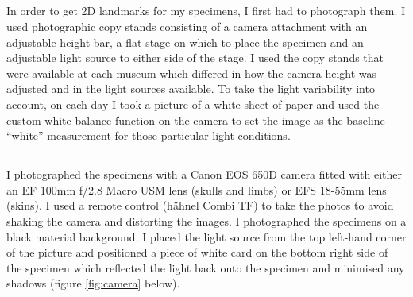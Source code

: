 \subsection{}
In order to get 2D landmarks for my specimens, I first had to photograph them. I used photographic copy stands consisting of a camera attachment with an adjustable height bar, a flat stage on which to place the specimen and an adjustable light source to either side of the stage. I used the copy stands that were available at each museum which differed in how the camera height was adjusted and in the light sources available.
To take the light variability into account, on each day I took a picture of a white sheet of paper and used the custom white balance function on the camera to set the image as the baseline “white” measurement for those particular light conditions.

\subsection{}
I photographed the specimens with a Canon EOS 650D camera fitted with either an EF 100mm f/2.8 Macro USM lens (skulls and limbs) or EFS 18-55mm lens (skins). I used a remote control (h\"ahnel Combi TF) to take the photos to avoid shaking the camera and distorting the images. I photographed the specimens on a black material background. I placed the light source from the top left-hand corner of the picture and positioned a piece of white card on the bottom right side of the specimen which reflected the light back onto the specimen and minimised any shadows (figure \ref{fig:camera} below).

